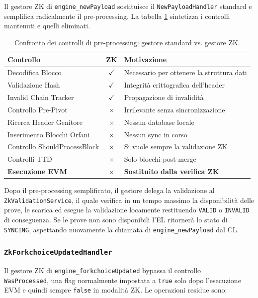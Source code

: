 \documentclass[12pt,a4paper,openright,twoside]{report}
\begin{document}
Il gestore ZK di \texttt{engine\_newPayload} sostituisce il \texttt{NewPayloadHandler} standard e semplifica radicalmente il pre-processing. La tabella \ref{tab:preprocessing} sintetizza i controlli mantenuti e quelli eliminati.
\\
\begin{table}[H]
\centering
\begin{tabular}{l c p{6cm}}
\hline
\textbf{Controllo} & \textbf{ZK} & \textbf{Motivazione} \\
\hline
Decodifica Blocco         & $\checkmark$ & Necessario per ottenere la struttura dati \\
Validazione Hash          & $\checkmark$ & Integrità crittografica dell'header \\
Invalid Chain Tracker     & $\checkmark$ & Propagazione di invalidità \\
\hline
Controllo Pre-Pivot       & $\times$ & Irrilevante senza sincronizzazione \\
Ricerca Header Genitore   & $\times$ & Nessun database locale \\
Inserimento Blocchi Orfani & $\times$ & Nessun sync in corso \\
Controllo ShouldProcessBlock & $\times$ & Si vuole sempre la validazione ZK \\
Controlli TTD             & $\times$ & Solo blocchi post-merge \\
\textbf{Esecuzione EVM}   & $\times$ & \textbf{Sostituito dalla verifica ZK} \\
\hline
\end{tabular}
\caption{Confronto dei controlli di pre-processing: gestore standard vs. gestore ZK.}
\label{tab:preprocessing}
\end{table}

Dopo il pre-processing semplificato, il gestore delega la validazione al \texttt{ZkValidationService}, il quale verifica in un tempo massimo la disponibilità delle prove, le scarica ed esegue la validazione locamente restituendo \texttt{VALID} o \texttt{INVALID} di conseguenza. Se le prove non sono disponibili l'EL ritornerà lo stato di \texttt{SYNCING}, aspettando nuovamente la chiamata di \texttt{engine\_newPayload} dal CL.

\subsubsection{\texttt{ZkForkchoiceUpdatedHandler}}

Il gestore ZK di \texttt{engine\_forkchoiceUpdated} bypassa il controllo \\\texttt{WasProcessed}, una flag normalmente impostata a \texttt{true} solo dopo l'esecuzione EVM e quindi sempre \texttt{false} in modalità ZK. Le operazioni residue sono:
\end{document}
